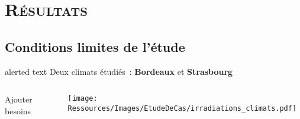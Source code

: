 \documentclass[xcolor=x11names, compress, 11pt]{beamer}
\makeatletter
\DeclarePairedDelimiter\abs{\lvert}{\rvert}
\let\oldabs\abs
\def\abs{\@ifstar{\oldabs}{\oldabs*}}
\newcommand{\addalert}[1]{%
\begin{beamercolorbox}[sep=2pt,center,shadow=true,rounded=true]{alerted text}
    #1\par%
\end{beamercolorbox}%
}
\makeatother
\begin{document}


\section{\scshape Résultats}


\subsection{Conditions limites de l’étude}
\begin{frame}[t]
    \centering
    \addalert{\small Deux climats étudiés~: \textbf{Bordeaux} et \textbf{Strasbourg}}
    \vfill
    \begin{columns}
        \begin{column}{0.5\textwidth}
            \alert{Ajouter besoins}
        \end{column}
        \begin{column}{0.5\textwidth}
            \texttt{[image: Ressources/Images/EtudeDeCas/irradiations\_climats.pdf]}
        \end{column}
    \end{columns}
    \vfill

    \vfill
\end{frame}
\end{document}
